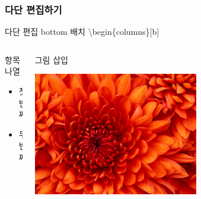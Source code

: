 \documentclass[10pt,blue,xcolor=pdftex,dvipsnames,table,handout]{beamer}
\begin{document}
		\begin{frame}[t]
		\frametitle{다단 편집하기}

			\begin{example} {다단 편집 bottom 배치}
			\textbackslash begin\{columns\}[b]
			\end{example}

		\begin{columns}[b]
		\begin{column}{.5\textwidth}

			\begin{block} {항목 나열}
			\begin{itemize}
			\item 첫 번째
			\item 두 번째
			\end{itemize}
			\end{block}

		\end{column}

		\begin{column}{.4\textwidth}

			\begin{block} {그림 삽입}
			\centerline{\includegraphics[scale=1.0,width=0.6\textwidth]{./fig/Chrysanthemum.jpg}}
			\end{block}

		\end{column}
		\end{columns}
		\end{frame}



		\begin{frame}[plain] \end{frame}
\end{document}
